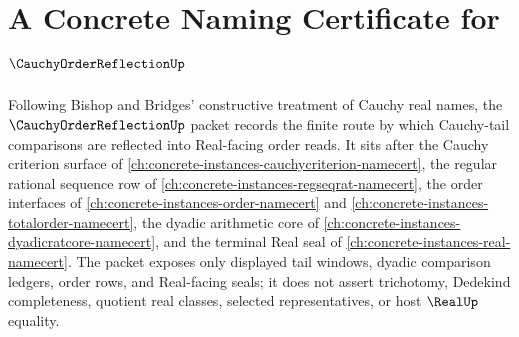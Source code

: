 \chapter{A Concrete Naming Certificate for $\CauchyOrderReflectionUp$}
\label{ch:concrete-instances-cauchy-order-reflection-namecert}

Following Bishop and Bridges' constructive treatment of Cauchy real names, the $\CauchyOrderReflectionUp$ packet records the finite route by which Cauchy-tail comparisons are reflected into Real-facing order reads. It sits after the Cauchy criterion surface of \autoref{ch:concrete-instances-cauchycriterion-namecert}, the regular rational sequence row of \autoref{ch:concrete-instances-regseqrat-namecert}, the order interfaces of \autoref{ch:concrete-instances-order-namecert} and \autoref{ch:concrete-instances-totalorder-namecert}, the dyadic arithmetic core of \autoref{ch:concrete-instances-dyadicratcore-namecert}, and the terminal Real seal of \autoref{ch:concrete-instances-real-namecert}. The packet exposes only displayed tail windows, dyadic comparison ledgers, order rows, and Real-facing seals; it does not assert trichotomy, Dedekind completeness, quotient real classes, selected representatives, or host $\RealUp$ equality.

